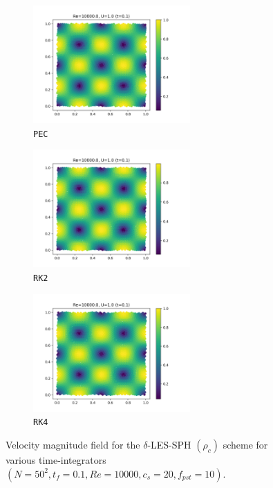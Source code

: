 \begin{figure}[H]
  \begin{subfigure}{7cm}
    \centering\includegraphics[width=6cm]{Code-Figures/deltales/integrator/c0_20_tait_pec_dtmul_1_nx_50_pst_10_re_10000_deltales/final_vmag.png}
    \caption{\texttt{PEC}}
  \end{subfigure}
  \begin{subfigure}{7cm}
    \centering\includegraphics[width=6cm]{Code-Figures/deltales/integrator/c0_20_tait_rk2_dtmul_1.5_nx_50_pst_10_re_10000_deltales/final_vmag.png}
    \caption{\texttt{RK2}}
  \end{subfigure}
  \begin{subfigure}{7cm}
    \centering\includegraphics[width=6cm]{Code-Figures/deltales/integrator/c0_20_tait_rk4_dtmul_2_nx_50_pst_10_re_10000_deltales/final_vmag.png}
    \caption{\texttt{RK4}}
  \end{subfigure}
  \caption{Velocity magnitude field for the $\delta$-LES-SPH $(\rho_c)$ scheme for various time-integrators $(N=50^2, t_f=0.1, Re=10000, c_s=20, f_{pst}=10)$.}
  \label{fig:deltales-integrator-vmag}
\end{figure}

